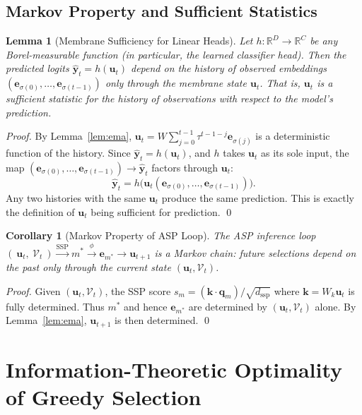 \documentclass[11pt,a4paper]{article}
\newtheorem{lemma}[theorem]{Lemma}
\newtheorem{corollary}[theorem]{Corollary}
\newcommand{\bu}{\mathbf{u}}
\newcommand{\be}{\mathbf{e}}
\newcommand{\by}{\mathbf{y}}
\newcommand{\bk}{\mathbf{k}}
\newcommand{\bq}{\mathbf{q}}
\newcommand{\bW}{W}
\newcommand{\RR}{\mathbb{R}}
\begin{document}
\subsection{Markov Property and Sufficient Statistics}

\begin{lemma}[Membrane Sufficiency for Linear Heads]
\label{lem:sufficiency}
Let $h: \RR^D \to \RR^C$ be any Borel-measurable function (in particular, the
learned classifier head).  Then the predicted logits $\hat{\by}_t = h(\bu_t)$
depend on the history of observed embeddings $(\be_{\sigma(0)}, \ldots, \be_{\sigma(t-1)})$
only through the membrane state $\bu_t$.  That is, $\bu_t$ is a \emph{sufficient
statistic} for the history of observations with respect to the model's prediction.
\end{lemma}

\begin{proof}
By Lemma~\ref{lem:ema}, $\bu_t = \bW \sum_{j=0}^{t-1} \tau^{t-1-j} \be_{\sigma(j)}$
is a deterministic function of the history.  Since $\hat{\by}_t = h(\bu_t)$, and
$h$ takes $\bu_t$ as its sole input, the map
$(\be_{\sigma(0)}, \ldots, \be_{\sigma(t-1)}) \to \hat{\by}_t$
factors through $\bu_t$:
\[
  \hat{\by}_t = h\bigl(\bu_t(\be_{\sigma(0)}, \ldots, \be_{\sigma(t-1)})\bigr).
\]
Any two histories with the same $\bu_t$ produce the same prediction.  This is
exactly the definition of $\bu_t$ being sufficient for prediction.  \qed
\end{proof}

\begin{corollary}[Markov Property of ASP Loop]
\label{cor:markov}
The ASP inference loop
$(\ \bu_t,\ \mathcal{V}_t\ ) \xrightarrow{\text{SSP}} m^* \xrightarrow{\phi} \be_{m^*} \to \bu_{t+1}$
is a Markov chain: future selections depend on the past only through the current
state $(\bu_t, \mathcal{V}_t)$.
\end{corollary}

\begin{proof}
Given $(\bu_t, \mathcal{V}_t)$, the SSP score
$s_m = (\bk \cdot \bq_m)/\sqrt{d_\mathrm{ssp}}$ where $\bk = W_k \bu_t$ is
fully determined.  Thus $m^*$ and hence $\be_{m^*}$ are determined by $(\bu_t, \mathcal{V}_t)$
alone.  By Lemma~\ref{lem:ema}, $\bu_{t+1}$ is then determined.  \qed
\end{proof}

\section{Information-Theoretic Optimality of Greedy Selection}
\end{document}
